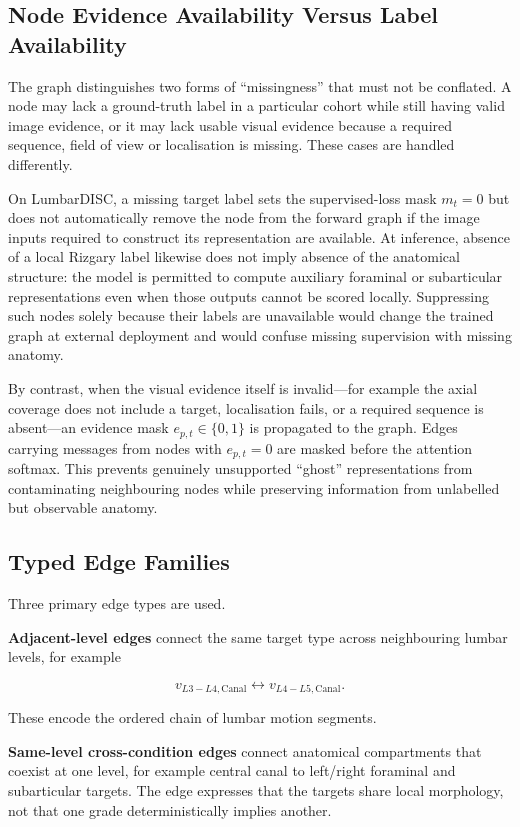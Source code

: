 \subsection{Node Evidence Availability Versus Label Availability}
\label{sec:method-node-availability}

The graph distinguishes two forms of ``missingness'' that must not be conflated.
A node may lack a ground-truth label in a particular cohort while still having
valid image evidence, or it may lack usable visual evidence because a required
sequence, field of view or localisation is missing. These cases are handled
differently.

On LumbarDISC, a missing target label sets the supervised-loss mask $m_t=0$ but
does not automatically remove the node from the forward graph if the image
inputs required to construct its representation are available. At inference,
absence of a local Rizgary label likewise does not imply absence of the
anatomical structure: the model is permitted to compute auxiliary foraminal or
subarticular representations even when those outputs cannot be scored locally.
Suppressing such nodes solely because their labels are unavailable would change
the trained graph at external deployment and would confuse missing supervision
with missing anatomy.

By contrast, when the visual evidence itself is invalid---for example the axial
coverage does not include a target, localisation fails, or a required sequence
is absent---an evidence mask $e_{p,t}\in\{0,1\}$ is propagated to the graph.
Edges carrying messages from nodes with $e_{p,t}=0$ are masked before the
attention softmax. This prevents genuinely unsupported ``ghost''
representations from contaminating neighbouring nodes while preserving
information from unlabelled but observable anatomy.

\subsection{Typed Edge Families}
\label{sec:method-edge-types}

Three primary edge types are used.

\textbf{Adjacent-level edges} connect the same target type across neighbouring
lumbar levels, for example

\[
v_{L3-L4,\mathrm{Canal}}
\leftrightarrow
v_{L4-L5,\mathrm{Canal}}.
\]

These encode the ordered chain of lumbar motion segments.

\textbf{Same-level cross-condition edges} connect anatomical compartments that
coexist at one level, for example central canal to left/right foraminal and
subarticular targets. The edge expresses that the targets share local
morphology, not that one grade deterministically implies another.

